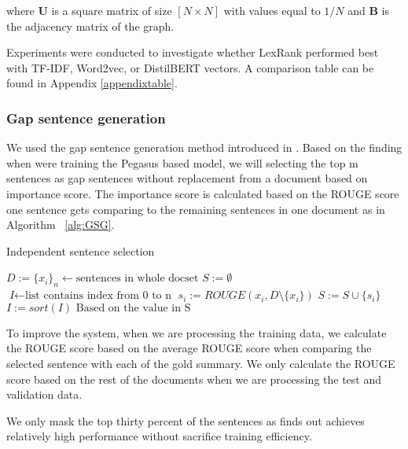 \noindent where $\bm{U}$ is a square matrix of size $[N \times N]$ with values equal to $1/N$ and $\bm{B}$ is the adjacency matrix of the graph. 

Experiments were conducted to investigate whether LexRank performed best with TF-IDF, Word2vec, or DistilBERT vectors. A comparison table can be found in Appendix \ref{appendixtable}.

\subsubsection{Gap sentence generation} \label{GSG}
We used the gap sentence generation method introduced in \citet{pegasus}. Based on the finding when \citeauthor{pegasus} were training the Pegasus based model, we will selecting the top m sentences as gap sentences without replacement from a document based on importance score. The importance score is calculated based on the ROUGE score one sentence gets comparing to the remaining sentences in one document as in Algorithm ~\ref{alg:GSG}.

\begin{algorithm}[H]
\caption{Independent sentence selection}\label{alg:GSG}
\begin{algorithmic}[1]
\State $ \textit{D} := \{x_i\}_n \gets \text{sentences in whole docset}$
\State $ \textit{S} := \emptyset$
\State $ \textit{I} \gets \text{list contains index from 0 to n}$
\State $ s_i := \textit{ROUGE}(x_i, D \setminus \{x_i\}) $
\State $ S := S \cup \{s_i\} $
\EndFor
\State $ I := sort(I) \text{ Based on the value in S}$
\end{algorithmic}
\end{algorithm}

To improve the system, when we are processing the training data, we calculate the ROUGE score based on the average ROUGE score when comparing the selected sentence with each of the gold summary. We only calculate the ROUGE score based on the rest of the documents when we are processing the test and validation data.

We only mask the top thirty percent of the sentences as \citeauthor{pegasus} finds out achieves relatively high performance without sacrifice training efficiency.